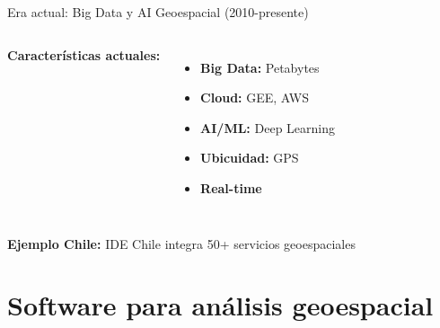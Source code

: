 \documentclass[10pt]{beamer}
\begin{document}
\begin{frame}{Era actual: Big Data y AI Geoespacial (2010-presente)}
    \begin{columns}
        \textbf{Características actuales:}
        \begin{itemize}
            \item \textcolor{blue}{} \textbf{Big Data:} Petabytes
            \item \textcolor{green}{} \textbf{Cloud:} GEE, AWS
            \item \textcolor{red}{} \textbf{AI/ML:} Deep Learning
            \item \textcolor{orange}{} \textbf{Ubicuidad:} GPS
            \item \textcolor{purple}{} \textbf{Real-time}
        \end{itemize}
        
    \end{columns}
    
    \vspace{0.3cm}
    \textbf{Ejemplo Chile:} IDE Chile integra 50+ servicios geoespaciales
\end{frame}

\section{Software para análisis geoespacial}
\end{document}
